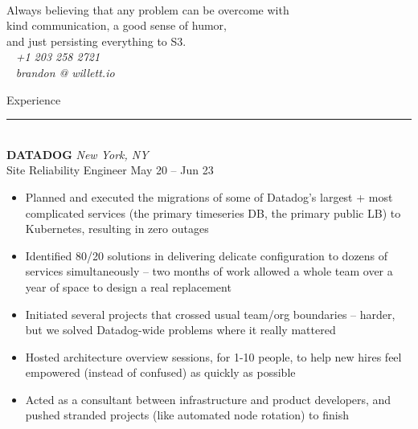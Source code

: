 \documentclass[letterpaper]{article}
\begin{document}
	\begin{bgbox}[height=\paperheight, colback=white, width=0.62\textwidth]\raggedright
		\vspace*{9pt}
		\begin{bgbox}[height=1.60in, colback=gray!15, width=\textwidth, top=0.05in]
			\\
			Always believing that any problem can be overcome with \\
			kind communication, a good sense of humor, \\
			and just persisting everything to S3. \\
			\null \hfill {\large\Telefon}~ \textit{+1 203 258 2721} \\
			\null \hfill {\large\Letter}~ \textit{brandon @ willett.io } \\
		\end{bgbox}\vspace*{25.5pt}
		{\Huge{Experience}}\\[-6pt]
		\noindent\rule{\textwidth}{1pt}\\[12pt]
		\textbf{DATADOG} \hfill \textit{New York, NY}\\
		Site Reliability Engineer \hfill May 20 -- Jun 23
		\begin{itemize} [noitemsep,topsep=4pt]
			\item Planned and executed the migrations of some of Datadog's largest + most complicated services (the primary timeseries DB, the primary public LB) to Kubernetes, resulting in zero outages
			\item Identified 80/20 solutions in delivering delicate configuration to dozens of services simultaneously -- two months of work allowed a whole team over a year of space to design a real replacement
			\item Initiated several projects that crossed usual team/org boundaries -- harder, but we solved Datadog-wide problems where it really mattered
			\item Hosted architecture overview sessions, for 1-10 people, to help new hires feel empowered (instead of confused) as quickly as possible
			\item Acted as a consultant between infrastructure and product developers, and pushed stranded projects (like automated node rotation) to finish

\end{itemize}
\end{bgbox}
\end{document}
